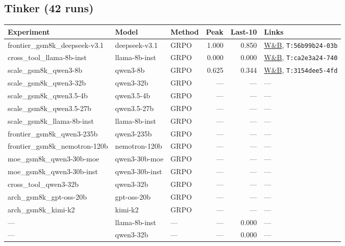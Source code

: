 \documentclass[12pt,a4paper]{report}
\theoremstyle{definition}
\begin{document}
\subsection{Tinker (42 runs)}
\label{sec:registry-tinker}

{\small
\begin{longtable}{p{3.5cm}p{2cm}p{1.2cm}rrp{3.5cm}}
\toprule
\textbf{Experiment} & \textbf{Model} & \textbf{Method} & \textbf{Peak} & \textbf{Last-10} & \textbf{Links} \\
\midrule
\endhead
frontier\_gsm8k\_deepseek-v3.1 & deepseek-v3.1 & GRPO & 1.000 & 0.850 & \href{https://wandb.ai/arvindcr4-pes-university/tinker-rl-lab-world-class/runs/56b99b24-03bd-5d00-ae23-831933ef53b2}{W\&B}, \texttt{T:56b99b24-03b} \\
cross\_tool\_llama-8b-inst & llama-8b-inst & GRPO & 0.000 & 0.000 & \href{https://wandb.ai/arvindcr4-pes-university/tinker-rl-lab-world-class/runs/ca2e3a24-7401-5770-af34-a0d27177aeaa}{W\&B}, \texttt{T:ca2e3a24-740} \\
scale\_gsm8k\_qwen3-8b & qwen3-8b & GRPO & 0.625 & 0.344 & \href{https://wandb.ai/arvindcr4-pes-university/tinker-rl-lab-world-class/runs/3154dee5-4fd7-59b6-ba3b-721eef675bfc}{W\&B}, \texttt{T:3154dee5-4fd} \\
scale\_gsm8k\_qwen3-32b & qwen3-32b & GRPO & --- & --- & --- \\
scale\_gsm8k\_qwen3.5-4b & qwen3.5-4b & GRPO & --- & --- & --- \\
scale\_gsm8k\_qwen3.5-27b & qwen3.5-27b & GRPO & --- & --- & --- \\
scale\_gsm8k\_llama-8b-inst & llama-8b-inst & GRPO & --- & --- & --- \\
frontier\_gsm8k\_qwen3-235b & qwen3-235b & GRPO & --- & --- & --- \\
frontier\_gsm8k\_nemotron-120b & nemotron-120b & GRPO & --- & --- & --- \\
moe\_gsm8k\_qwen3-30b-moe & qwen3-30b-moe & GRPO & --- & --- & --- \\
moe\_gsm8k\_qwen3-30b-inst & qwen3-30b-inst & GRPO & --- & --- & --- \\
cross\_tool\_qwen3-32b & qwen3-32b & GRPO & --- & --- & --- \\
arch\_gsm8k\_gpt-oss-20b & gpt-oss-20b & GRPO & --- & --- & --- \\
arch\_gsm8k\_kimi-k2 & kimi-k2 & GRPO & --- & --- & --- \\
--- & llama-8b-inst & --- & --- & 0.000 & --- \\
--- & qwen3-32b & --- & --- & 0.000 & --- \\

\end{longtable}}
\end{document}
